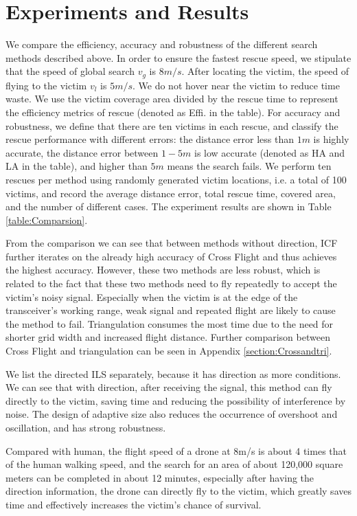 \documentclass[conference]{IEEEtran}
\begin{document}
\section{Experiments and Results}\label{section:Experiments and Results}
We compare the efficiency, accuracy and robustness of the different search methods described above. In order to ensure the fastest rescue speed, we stipulate that the speed of global search $v_{g}$ is $8m/s$. After locating the victim, the speed of flying to the victim $v_{l}$ is $5m/s$. We do not hover near the victim to reduce time waste. We use the victim coverage area divided by the rescue time to represent the efficiency metrics of rescue (denoted as Effi. in the table). For accuracy and robustness, we define that there are ten victims in each rescue, and classify the rescue performance with different errors: the distance error less than $1m$ is highly accurate, the distance error between $1-5m$ is low accurate (denoted as HA and LA in the table), and higher than $5m$ means the search fails. We perform ten rescues per method using randomly generated victim locations, i.e. a total of 100 victims, and record the average distance error, total rescue time, covered area, and the number of different cases. The experiment results are shown in Table \ref{table:Comparsion}.

From the comparison we can see that between methods without direction, ICF further iterates on the already high accuracy of Cross Flight and thus achieves the highest accuracy. However, these two methods are less robust, which is related to the fact that these two methods need to fly repeatedly to accept the victim's noisy signal. Especially when the victim is at the edge of the transceiver's working range, weak signal and repeated flight are likely to cause the method to fail. Triangulation consumes the most time due to the need for shorter grid width and increased flight distance. Further comparison between Cross Flight and triangulation can be seen in Appendix \ref{section:Crossandtri}.

We list the directed ILS separately, because it has direction as more conditions. We can see that with direction, after receiving the signal, this method can fly directly to the victim, saving time and reducing the possibility of interference by noise. The design of adaptive size also reduces the occurrence of overshoot and oscillation, and has strong robustness.

Compared with human, the flight speed of a drone at 8m/s is about 4 times that of the human walking speed, and the search for an area of about 120,000 square meters can be completed in about 12 minutes, especially after having the direction information, the drone can directly fly to the victim, which greatly saves time and effectively increases the victim's chance of survival. 
\end{document}
